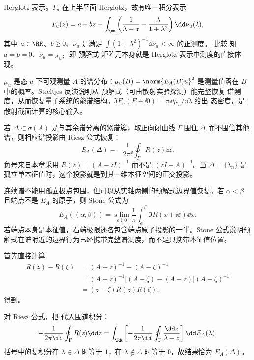 Herglotz 表示。$F_u$ 在上半平面 Herglotz，故有唯一积分表示
\[
 F_u(z)=a+bz+\int_\RR\left(\frac1{\lambda-z}-\frac{\lambda}{1+\lambda^2}\right)
 \dd\nu_u(\lambda),
\]
其中 $a\in\RR$、$b\ge0$、$\nu_u$ 是满足 $\int(1+\lambda^2)^{-1}\dd\nu_u<\infty$ 的正测度。
比较 知 $a=b=0$、$\nu_u=\mu_u$，即 预解式
矩阵元本身就是 Herglotz 表示中测度的直接体现。

$\mu_u$ 是态 $u$ 下可观测量 $A$ 的谱分布：$\mu_u(B)=\norm{E_A(B)u}^2$
是测量值落在 $B$ 中的概率。Stieltjes 反演说明从 预解式（可由散射实验探测）能完整恢复
谱测度，从而恢复量子系统的能谱结构。$\Im F_u(E+\ii0)=\pi\,\dd\mu_u/\dd\lambda$ 给出
态密度，是散射截面计算的核心输入。

若 $\Delta\subset\sigma(A)$ 是与其余谱分离的紧谱簇，取正向闭曲线 $\Gamma$ 围住 $\Delta$ 而不围住其他谱，则相应谱投影由 Riesz 公式恢复：
\begin{equation}\label{eq:math-sl-riesz-projection}
 E_A(\Delta)
 =-\frac{1}{2\pi\ii}\oint_\Gamma R(z)\dd z.
\end{equation}
负号来自本章采用 $R(z)=(A-zI)^{-1}$ 而不是 $(zI-A)^{-1}$。当 $\Delta=\{\lambda_n\}$ 是孤立单本征值时，这个投影就是到其一维本征空间的正交投影。

连续谱不能用孤立极点包围，但可以从实轴两侧的预解式边界值恢复。若 $\alpha<\beta$ 且端点不是 $E_A$ 的原子，则 Stone 公式为
\begin{equation}\label{eq:math-sl-stone-formula}
 E_A((\alpha,\beta))
 =\operatorname*{s-lim}_{\varepsilon\downarrow0}
 \frac{1}{\pi}\int_\alpha^\beta
 \Im R(x+\ii\varepsilon)\dd x.
\end{equation}
若端点本身是本征值，右端极限还各包含端点原子投影的一半。Stone 公式说明预解式在谱附近的边界行为已经携带完整谱测度，而不是只携带本征值位置。

首先直接计算
\[
\begin{aligned}
 R(z)-R(\zeta)
 &=(A-z)^{-1}-(A-\zeta)^{-1}\\
 &=(A-z)^{-1}\bigl[(A-\zeta)-(A-z)\bigr](A-\zeta)^{-1}\\
 &=(z-\zeta)R(z)R(\zeta),
\end{aligned}
\]
得到。

对 Riesz 公式，把 代入围道积分：
\[
 -\frac{1}{2\pi\ii}\oint_\Gamma R(z)\dd z
 =\int_{\RR}
 \left[-\frac{1}{2\pi\ii}\oint_\Gamma\frac{\dd z}{\lambda-z}\right]
 \dd E_A(\lambda).
\]
括号中的复积分在 $\lambda\in\Delta$ 时等于 $1$，在 $\lambda\notin\Delta$ 时等于 $0$，故结果恰为 $E_A(\Delta)$。

